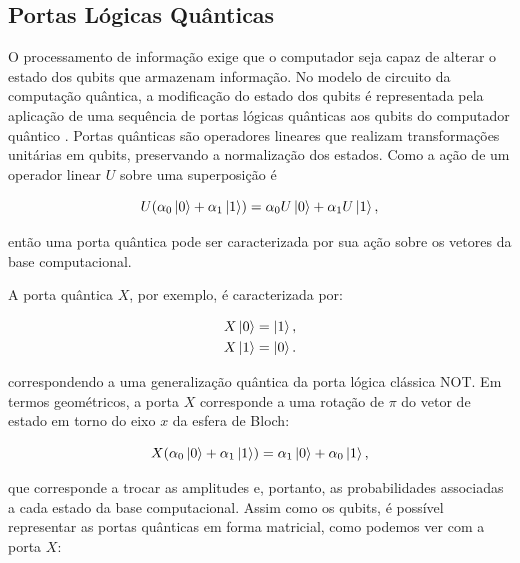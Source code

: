 \subsection{Portas Lógicas Quânticas} \label{Portas}

O processamento de informação exige que o computador seja capaz de alterar o estado dos qubits que armazenam informação. No modelo de circuito da computação quântica, a modificação do estado dos qubits é representada pela aplicação de uma sequência de portas lógicas quânticas aos qubits do computador quântico \cite{Nielsen}. Portas quânticas são operadores lineares que realizam transformações unitárias em qubits, preservando a normalização dos estados. Como a ação de um operador linear $U$ sobre uma superposição é

\begin{center}
\begin{equation}
  U(\alpha_0\ket{0} + \alpha_1\ket{1}) = \alpha_0 U\ket{0} +\alpha_1 U\ket{1},
\end{equation}
\end{center}

\noindent então uma porta quântica pode ser caracterizada por sua ação sobre os vetores da base computacional. 

A porta quântica $X$, por exemplo, é caracterizada por:

\begin{center}
\begin{equation}
\begin{aligned}
X\ket{0} &= \ket{1}, \\
X\ket{1} &= \ket{0}.
\end{aligned}
\end{equation}
\end{center}

\noindent correspondendo a uma generalização quântica da porta lógica clássica NOT. Em termos geométricos, a porta $X$ corresponde a uma rotação de $\pi$ do vetor de estado em torno do eixo $x$ da esfera de Bloch:

\begin{center}
\begin{equation}
X (\alpha_0\ket{0} + \alpha_1\ket{1}) = \alpha_1 \ket{0} + \alpha_0 \ket{1},
\end{equation}
\end{center}

\noindent que corresponde a trocar as amplitudes e, portanto, as probabilidades associadas a cada estado da base computacional. Assim como os qubits, é possível representar as portas quânticas em forma matricial, como podemos ver com a porta $X$:

